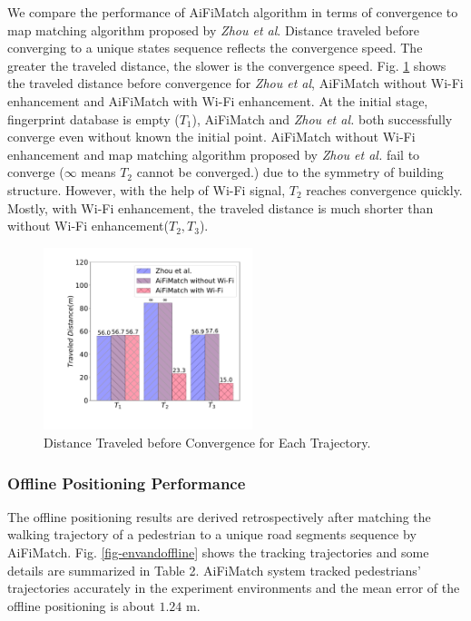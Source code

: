 \documentclass[conference]{IEEEtran}
\begin{document}
We compare the performance of AiFiMatch algorithm in terms of convergence to map matching algorithm proposed by \emph{Zhou et al}. Distance traveled before converging to a unique states sequence reflects the convergence speed. The greater the traveled distance, the slower is the convergence speed. Fig. \ref{fig-converg} shows the traveled distance before convergence for \emph{Zhou et al}, AiFiMatch without Wi-Fi enhancement and AiFiMatch with Wi-Fi enhancement. At the initial stage, fingerprint database is empty ($T_1$), AiFiMatch and \emph{Zhou et al.} both successfully converge even without known the initial point. AiFiMatch without Wi-Fi enhancement and map matching algorithm proposed by \emph{Zhou et al.} fail to converge ($\infty$ means $T_2$ cannot be converged.) due to the symmetry of building structure. However, with the help of Wi-Fi signal, $T_2$ reaches convergence quickly. Mostly, with Wi-Fi enhancement, the traveled distance is much shorter than without Wi-Fi enhancement($T_2, T_3$). 

\begin{figure}[!htbp]
	\centering
	\includegraphics[width=2.4in]{AiFiMatch-Convergence}
	\caption{Distance Traveled before Convergence for Each Trajectory.}
	\label{fig-converg}
\end{figure}

\subsubsection{Offline Positioning Performance}

The offline positioning results are derived retrospectively after matching the walking trajectory of a pedestrian to a unique road segments sequence by AiFiMatch. Fig. \ref{fig-envandoffline} shows the tracking trajectories and some details are summarized in Table 2. AiFiMatch system tracked pedestrians' trajectories accurately in the experiment environments and the mean error of the offline positioning is about $1.24$ m.
\end{document}
